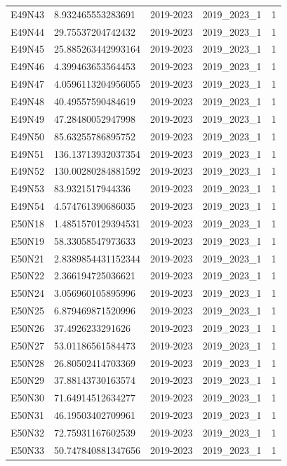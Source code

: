 \begin{landscape}
\begin{longtable}{lllll}
E49N43 & 8.932465553283691 & 2019-2023 & 2019\_2023\_1 & 1 \\
E49N44 & 29.75537204742432 & 2019-2023 & 2019\_2023\_1 & 1 \\
E49N45 & 25.885263442993164 & 2019-2023 & 2019\_2023\_1 & 1 \\
E49N46 & 4.399463653564453 & 2019-2023 & 2019\_2023\_1 & 1 \\
E49N47 & 4.0596113204956055 & 2019-2023 & 2019\_2023\_1 & 1 \\
E49N48 & 40.49557590484619 & 2019-2023 & 2019\_2023\_1 & 1 \\
E49N49 & 47.28480052947998 & 2019-2023 & 2019\_2023\_1 & 1 \\
E49N50 & 85.63255786895752 & 2019-2023 & 2019\_2023\_1 & 1 \\
E49N51 & 136.13713932037354 & 2019-2023 & 2019\_2023\_1 & 1 \\
E49N52 & 130.00280284881592 & 2019-2023 & 2019\_2023\_1 & 1 \\
E49N53 & 83.9321517944336 & 2019-2023 & 2019\_2023\_1 & 1 \\
E49N54 & 4.574761390686035 & 2019-2023 & 2019\_2023\_1 & 1 \\
E50N18 & 1.4851570129394531 & 2019-2023 & 2019\_2023\_1 & 1 \\
E50N19 & 58.33058547973633 & 2019-2023 & 2019\_2023\_1 & 1 \\
E50N21 & 2.8389854431152344 & 2019-2023 & 2019\_2023\_1 & 1 \\
E50N22 & 2.366194725036621 & 2019-2023 & 2019\_2023\_1 & 1 \\
E50N24 & 3.056960105895996 & 2019-2023 & 2019\_2023\_1 & 1 \\
E50N25 & 6.879469871520996 & 2019-2023 & 2019\_2023\_1 & 1 \\
E50N26 & 37.4926233291626 & 2019-2023 & 2019\_2023\_1 & 1 \\
E50N27 & 53.01186561584473 & 2019-2023 & 2019\_2023\_1 & 1 \\
E50N28 & 26.80502414703369 & 2019-2023 & 2019\_2023\_1 & 1 \\
E50N29 & 37.88143730163574 & 2019-2023 & 2019\_2023\_1 & 1 \\
E50N30 & 71.64914512634277 & 2019-2023 & 2019\_2023\_1 & 1 \\
E50N31 & 46.19503402709961 & 2019-2023 & 2019\_2023\_1 & 1 \\
E50N32 & 72.75931167602539 & 2019-2023 & 2019\_2023\_1 & 1 \\
E50N33 & 50.747840881347656 & 2019-2023 & 2019\_2023\_1 & 1 \\

\end{longtable}
\end{landscape}
